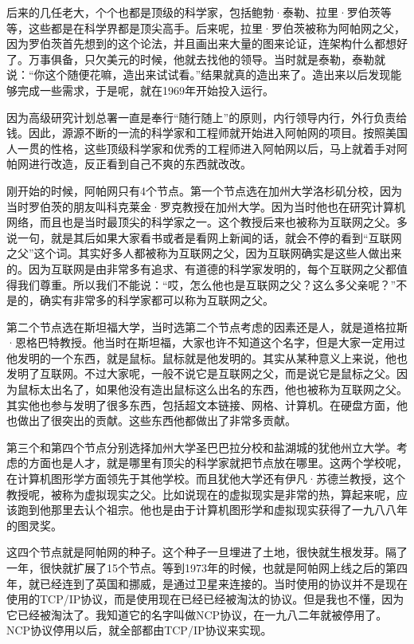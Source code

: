 \documentclass[
  letterpaper,
  DIV=11,
  numbers=noendperiod]{scrreprt}
\begin{document}
后来的几任老大，个个也都是顶级的科学家，包括鲍勃·泰勒、拉里·罗伯茨等等，这些都是在科学界都是顶尖高手。后来呢，拉里·罗伯茨被称为阿帕网之父，因为罗伯茨首先想到的这个论法，并且画出来大量的图来论证，连架构什么都想好了。万事俱备，只欠美元的时候，他就去找他的领导。当时就是泰勒，泰勒就说：``你这个随便花嘛，造出来试试看。''结果就真的造出来了。造出来以后发现能够完成一些需求，于是呢，就在1969年开始投入运行。

因为高级研究计划总署一直是奉行``随行随上''的原则，内行领导内行，外行负责给钱。因此，源源不断的一流的科学家和工程师就开始进入阿帕网的项目。按照美国人一贯的性格，这些顶级科学家和优秀的工程师进入阿帕网以后，马上就着手对阿帕网进行改造，反正看到自己不爽的东西就改改。

刚开始的时候，阿帕网只有4个节点。第一个节点选在加州大学洛杉矶分校，因为当时罗伯茨的朋友叫科克莱金·罗克教授在加州大学。因为当时他也在研究计算机网络，而且也是当时最顶尖的科学家之一。这个教授后来也被称为互联网之父。多说一句，就是其后如果大家看书或者是看网上新闻的话，就会不停的看到``互联网之父''这个词。其实好多人都被称为互联网之父，因为互联网确实是这些人做出来的。因为互联网是由非常多有追求、有道德的科学家发明的，每个互联网之父都值得我们尊重。所以我们不能说：``哎，怎么他也是互联网之父？这么多父亲呢？''不是的，确实有非常多的科学家都可以称为互联网之父。

第二个节点选在斯坦福大学，当时选第二个节点考虑的因素还是人，就是道格拉斯·恩格巴特教授。他当时在斯坦福，大家也许不知道这个名字，但是大家一定用过他发明的一个东西，就是鼠标。鼠标就是他发明的。其实从某种意义上来说，他也发明了互联网。不过大家呢，一般不说它是互联网之父，而是说它是鼠标之父。因为鼠标太出名了，如果他没有造出鼠标这么出名的东西，他也被称为互联网之父。其实他也参与发明了很多东西，包括超文本链接、网格、计算机。在硬盘方面，他也做出了很突出的贡献。这些东西他都做出了非常多贡献。

第三个和第四个节点分别选择加州大学圣巴巴拉分校和盐湖城的犹他州立大学。考虑的方面也是人才，就是哪里有顶尖的科学家就把节点放在哪里。这两个学校呢，在计算机图形学方面领先于其他学校。而且犹他大学还有伊凡·苏德兰教授，这个教授呢，被称为虚拟现实之父。比如说现在的虚拟现实是非常的热，算起来呢，应该跑到他那里去认个祖宗。他也是由于计算机图形学和虚拟现实获得了一九八八年的图灵奖。

这四个节点就是阿帕网的种子。这个种子一旦埋进了土地，很快就生根发芽。隔了一年，很快就扩展了15个节点。等到1973年的时候，也就是阿帕网上线之后的第四年，就已经连到了英国和挪威，是通过卫星来连接的。当时使用的协议并不是现在使用的TCP/IP协议，而是使用现在已经已经被淘汰的协议。但是我也不懂，因为它已经被淘汰了。我知道它的名字叫做NCP协议，在一九八二年就被停用了。NCP协议停用以后，就全部都由TCP/IP协议来实现。
\end{document}
